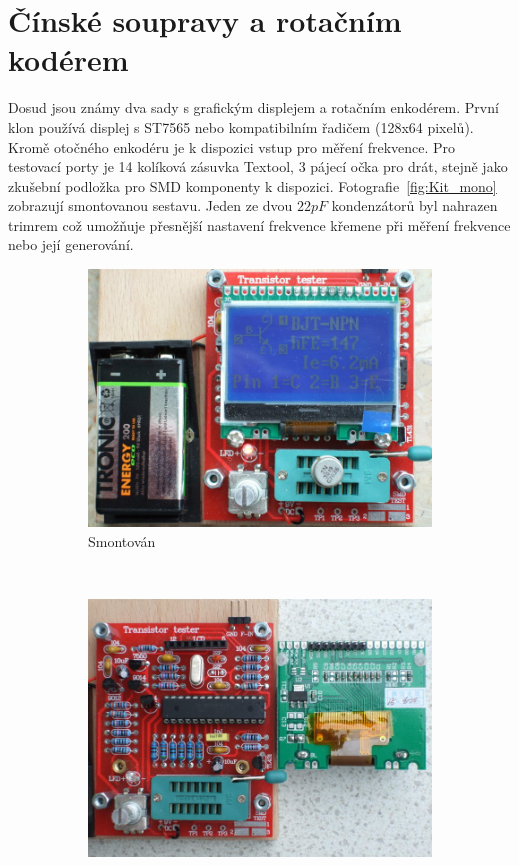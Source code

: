 \section{Čínské soupravy a rotačním kodérem}

Dosud jsou známy dva sady s grafickým displejem a rotačním enkodérem.
První klon používá displej s ST7565 nebo kompatibilním řadičem (128x64 pixelů).
Kromě otočného enkodéru je k dispozici vstup pro měření frekvence.
Pro testovací porty je 14 kolíková zásuvka Textool, 3 pájecí očka pro drát,
stejně jako zkušební podložka pro SMD komponenty k dispozici. 
Fotografie~\ref{fig:Kit_mono} zobrazují smontovanou sestavu. Jeden ze dvou \(22 pF\) kondenzátorů 
byl nahrazen trimrem což umožňuje přesnější nastavení frekvence křemene při měření
frekvence nebo její generování.
\begin{figure}[H]
  \begin{subfigure}[b]{.5\textwidth}
    \centering
    \includegraphics[width=1.\textwidth]{../PNG/Kit_ST7565a.jpg}
    \caption{Smontován}
  \end{subfigure}
  ~
  \begin{subfigure}[b]{.5\textwidth}
    \centering
    \includegraphics[width=1.\textwidth]{../PNG/Kit_ST7565b.jpg}

\end{subfigure}
\end{figure}
